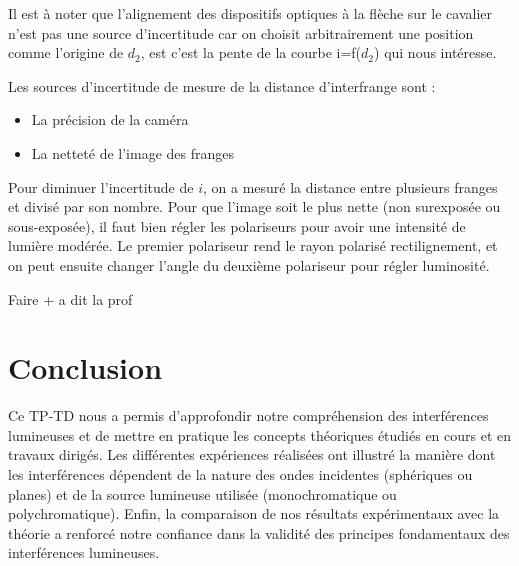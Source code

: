 \documentclass[11pt, a4paper]{article}
\begin{document}
Il est à noter que l'alignement des dispositifs optiques à la flèche sur le cavalier n'est pas une source d'incertitude car on choisit arbitrairement une position comme l'origine de $d_2$, est c'est la pente de la courbe i=f($d_2$) qui nous intéresse.

Les sources d'incertitude de mesure de la distance d'interfrange sont :
\begin{itemize}
    \item La précision de la caméra
    \item La netteté de l'image des franges
\end{itemize}

Pour diminuer l'incertitude de $i$, on a mesuré la distance entre plusieurs franges et divisé par son nombre. Pour que l'image soit le plus nette (non surexposée ou sous-exposée), il faut bien régler les polariseurs pour avoir une intensité de lumière modérée. Le premier polariseur rend le rayon polarisé rectilignement, et on peut ensuite changer l'angle du deuxième polariseur pour régler luminosité.

Faire + a dit la prof

\section{Conclusion}
Ce TP-TD nous a permis d'approfondir notre compréhension des interférences lumineuses et de mettre en pratique les concepts théoriques étudiés en cours et en travaux dirigés. Les différentes expériences réalisées ont illustré la manière dont les interférences dépendent de la nature des ondes incidentes (sphériques ou planes) et de la source lumineuse utilisée (monochromatique ou polychromatique). Enfin, la comparaison de nos résultats expérimentaux avec la théorie a renforcé notre confiance dans la validité des principes fondamentaux des interférences lumineuses.
\end{document}
